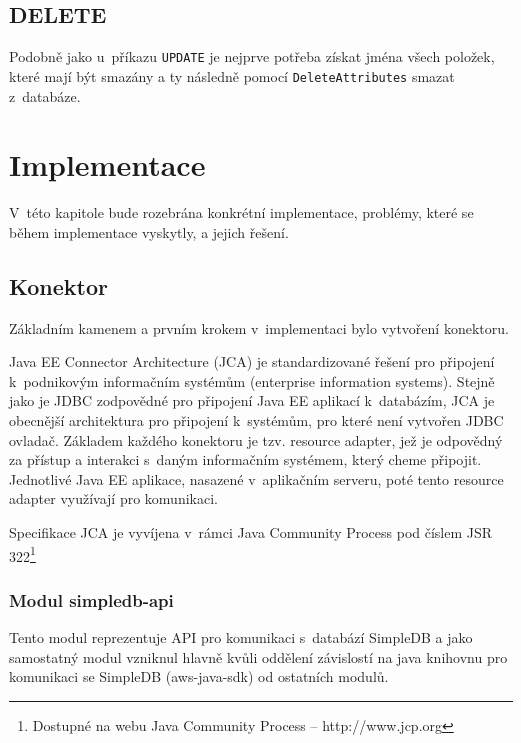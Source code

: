 \documentclass[oneside,12pt]{fithesis2}
\begin{document}
\section{DELETE}
Podobně jako u~příkazu \verb<UPDATE< je nejprve potřeba získat jména všech položek, které mají být smazány a ty následně pomocí \verb<DeleteAttributes< smazat z~databáze.
\chapter{Implementace}
\label{implementace}
V~této kapitole bude rozebrána konkrétní implementace, problémy, které se během implementace vyskytly, a jejich řešení.
\section{Konektor}
Základním kamenem a prvním krokem v~implementaci bylo vytvoření konektoru.

Java EE Connector Architecture (JCA) je standardizované řešení pro připojení k~podnikovým informačním systémům (enterprise information systems). Stejně jako je JDBC zodpovědné pro připojení Java EE aplikací k~databázím, JCA je obecnější architektura pro připojení k~systémům, pro které není vytvořen JDBC ovladač. Základem každého konektoru je tzv. resource adapter, jež je odpovědný za přístup a interakci s~daným informačním systémem, který cheme připojit. Jednotlivé Java EE aplikace, nasazené v~aplikačním serveru, poté tento resource adapter využívají pro komunikaci. 

Specifikace JCA je vyvíjena v~rámci Java Community Process pod číslem JSR 322\footnote{Dostupné na webu Java Community Process -- http://www.jcp.org}
\subsection{Modul simpledb-api}
Tento modul reprezentuje API pro komunikaci s~databází SimpleDB a jako samostatný modul vzniknul hlavně kvůli oddělení závislostí na java knihovnu pro komunikaci se SimpleDB (aws-java-sdk) od ostatních modulů.
\end{document}
